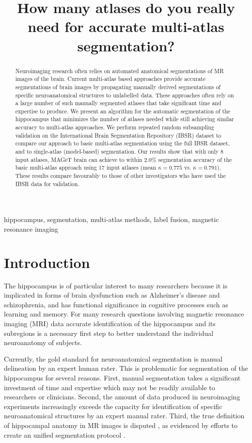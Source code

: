 \documentclass{article}\usepackage{graphicx, color}
\title{How many atlases do you really need for accurate multi-atlas segmentation?}
\begin{document}
\maketitle       

\begin{abstract}
Neuroimaging research often relies on automated anatomical segmentations of MR
images of the brain. Current multi-atlas based approaches provide accurate
segmentations of brain images by propagating manually derived segmentations of
specific neuroanatomical structures to unlabelled data. These approaches often
rely on a large number of such manually segmented atlases that take significant
time and expertise to produce. We present an algorithm for the automatic
segmentation of the hippocampus that minimizes the number of atlases needed
while still achieving similar accuracy to multi-atlas approaches.  We perform
repeated random subsampling validation on the International Brain Segmentation
Repository (IBSR) dataset to compare our approach to basic multi-atlas
segmentation using the full IBSR dataset, and to single-atlas (model-based)
segmentation. Our results show that with only 8 input atlases, MAGeT brain can
achieve to within 2.0\% segmentation accuracy of the basic multi-atlas approach
using 17 input atlases (mean $\kappa = 0.775$ vs.  $\kappa = 0.791$).  These
results compare favourably to those of other investigators who have used the IBSR
data for validation.
\end{abstract}

\begin{keywords}
hippocampus, segmentation, multi-atlas methods, label fusion, magnetic
resonance imaging 
\end{keywords}

\section{Introduction}
\label{sec:intro}

The hippocampus is of particular interest to many researchers because it is
implicated in forms of brain dysfunction such as Alzheimer's disease and
schizophrenia, and has functional significance in cognitive processes such as
learning and memory.  For many research questions involving magnetic resonance
imaging (MRI) data accurate identification of the hippocampus and its
subregions is a necessary first step to better understand the individual
neuroanatomy of subjects.  

Currently, the gold standard for neuroanatomical segmentation is manual
delineation by an expert human rater.  This is problematic for segmentation of
the hippocampus for several reasons.  First, manual segmentation takes a
significant investment of time and expertise \citep{Hammers2003} which may not
be readily available to researchers or clinicians.  Second, the amount of data
produced in neuroimaging experiments increasingly exceeds the capacity for
identification of specific neuroanatomical structures by an expert manual
rater.  Third, the true definition of hippocampal anatomy in MR images is
disputed \citep{Geuze2004}, as evidenced by efforts to create an unified
segmentation protocol \citep{Jack2011}.  
\end{document}
